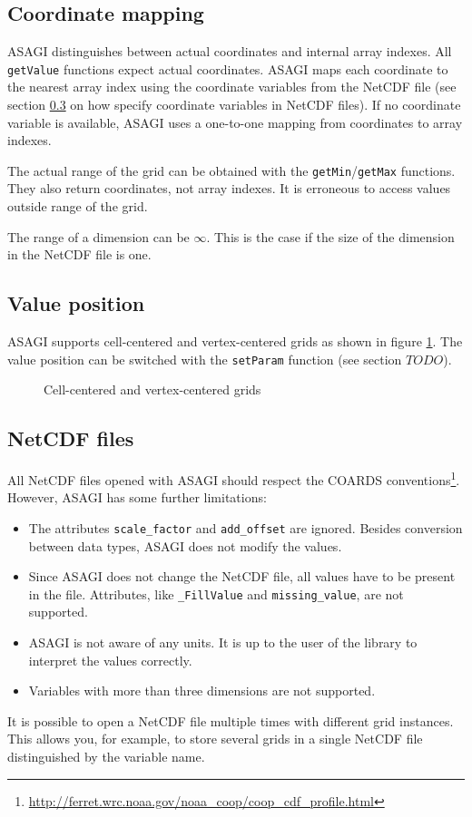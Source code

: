 \subsection{Coordinate mapping}

ASAGI distinguishes between actual coordinates and internal array indexes. All \texttt{getValue} functions expect actual coordinates. ASAGI maps each coordinate to the nearest array index using the coordinate variables from the NetCDF file (see section \ref{sec:netcdf files} on how specify coordinate variables in NetCDF files). If no coordinate variable is available, ASAGI uses a one-to-one mapping from coordinates to array indexes.

The actual range of the grid can be obtained with the \texttt{getMin}/\texttt{getMax} functions. They also return coordinates, not array indexes. It is erroneous to access values outside range of the grid.

The range of a dimension can be $\infty$. This is the case if the size of the dimension in the NetCDF file is one.

\subsection{Value position}

ASAGI supports cell-centered and vertex-centered grids as shown in figure \ref{fig:cell-centered vertex-centered}. The value position can be switched with the \texttt{setParam} function (see section $TODO$).

\begin{figure}[h]
 \def\xwidth{7}
 \def\ywidth{5}
 \def\scale{0.7}
 \centering
  \qquad
 \caption{Cell-centered and vertex-centered grids}
 \label{fig:cell-centered vertex-centered}
\end{figure}


\subsection{NetCDF files}
\label{sec:netcdf files}

All NetCDF files opened with ASAGI should respect the COARDS conventions\footnote{\url{http://ferret.wrc.noaa.gov/noaa_coop/coop_cdf_profile.html}}. However, ASAGI has some further limitations:
\begin{itemize}
 \item The attributes \texttt{scale\_factor} and \texttt{add\_offset} are ignored. Besides conversion between data types, ASAGI does not modify the values.
 \item Since ASAGI does not change the NetCDF file, all values have to be present in the file. Attributes, like \texttt{\_FillValue} and \texttt{missing\_value}, are not supported.
 \item ASAGI is not aware of any units. It is up to the user of the library to interpret the values correctly.
 \item Variables with more than three dimensions are not supported.
\end{itemize}

It is possible to open a NetCDF file multiple times with different grid instances. This allows you, for example, to store several grids in a single NetCDF file distinguished by the variable name.
